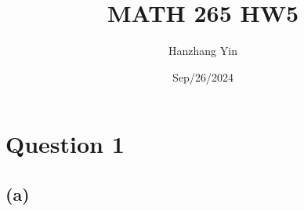 \documentclass{article}
\title{MATH 265 HW5}
\author{Hanzhang Yin}
\date{Sep/26/2024}
\begin{document}
\maketitle

\section*{Question 1}

\subsection*{(a)}
\end{document}
